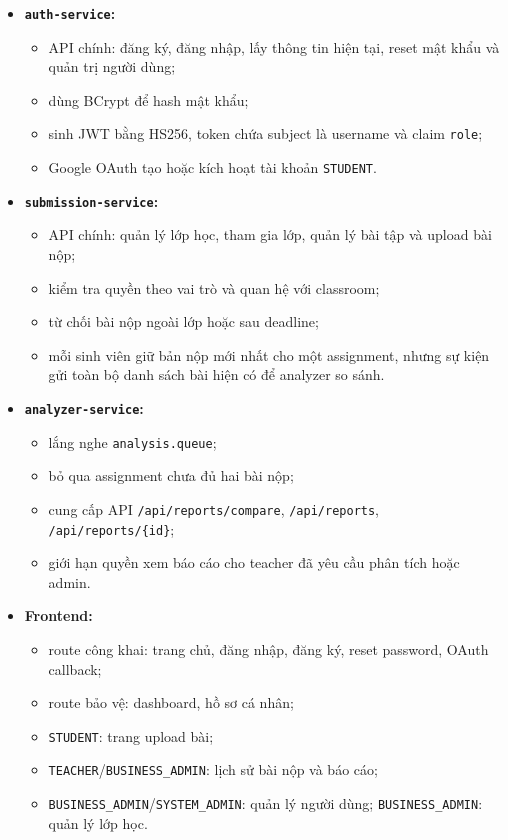 \documentclass[12pt,a4paper]{article}
\begin{document}
\begin{itemize}
    \item \textbf{\texttt{auth-service}:}
    \begin{itemize}
        \item API chính: đăng ký, đăng nhập, lấy thông tin hiện tại, reset mật khẩu và quản trị người dùng;
        \item dùng BCrypt để hash mật khẩu;
        \item sinh JWT bằng HS256, token chứa subject là username và claim \texttt{role};
        \item Google OAuth tạo hoặc kích hoạt tài khoản \texttt{STUDENT}.
    \end{itemize}
    \item \textbf{\texttt{submission-service}:}
    \begin{itemize}
        \item API chính: quản lý lớp học, tham gia lớp, quản lý bài tập và upload bài nộp;
        \item kiểm tra quyền theo vai trò và quan hệ với classroom;
        \item từ chối bài nộp ngoài lớp hoặc sau deadline;
        \item mỗi sinh viên giữ bản nộp mới nhất cho một assignment, nhưng sự kiện gửi toàn bộ danh sách bài hiện có để analyzer so sánh.
    \end{itemize}
    \item \textbf{\texttt{analyzer-service}:}
    \begin{itemize}
        \item lắng nghe \texttt{analysis.queue};
        \item bỏ qua assignment chưa đủ hai bài nộp;
        \item cung cấp API \texttt{/api/reports/compare}, \texttt{/api/reports}, \texttt{/api/reports/\{id\}};
        \item giới hạn quyền xem báo cáo cho teacher đã yêu cầu phân tích hoặc admin.
    \end{itemize}
    \item \textbf{Frontend:}
    \begin{itemize}
        \item route công khai: trang chủ, đăng nhập, đăng ký, reset password, OAuth callback;
        \item route bảo vệ: dashboard, hồ sơ cá nhân;
        \item \texttt{STUDENT}: trang upload bài;
        \item \texttt{TEACHER}/\texttt{BUSINESS\_ADMIN}: lịch sử bài nộp và báo cáo;
        \item \texttt{BUSINESS\_ADMIN}/\texttt{SYSTEM\_ADMIN}: quản lý người dùng; \texttt{BUSINESS\_ADMIN}: quản lý lớp học.
    \end{itemize}
\end{itemize}
\end{document}
